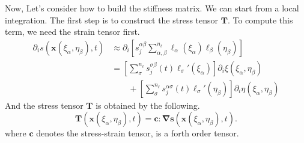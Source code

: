 \documentclass{book}
\begin{document}
Now, Let's consider how to build the stiffness matrix. We can start from a local integration. The first step is to construct the stress tensor $\boldsymbol T$. To compute this term, we need the strain tensor first. 
\begin{equation}
\begin{aligned}
 \partial_i s(\boldsymbol x(\xi_\alpha,\eta_\beta),t) &\approx \partial_i\left[s_j^{\alpha\beta}\sum_{\alpha,\beta}^{n_\ell}\ell_\alpha(\xi_\alpha)\ell_\beta(\eta_\beta)\right]\\
						 &= \left[\sum_\sigma^{n_\ell}s_j^{\sigma\beta}(t)\ell_\sigma'(\xi_\alpha)\right]\partial_i\xi(\xi_\alpha,\eta_\beta)\\
						 &\qquad +\left[\sum_\sigma^{n_\ell}s_j^{\alpha\sigma}(t)\ell_\sigma'(\eta_\beta)\right]\partial_i\eta(\xi_\alpha,\eta_\beta)
\end{aligned}
 \end{equation}
And the stress tensor $\boldsymbol T$ is obtained by the following.
\begin{equation}
 \boldsymbol T(\boldsymbol x(\xi_\alpha,\eta_\beta),t)=\boldsymbol c:\boldsymbol \nabla \boldsymbol s(\boldsymbol x(\xi_\alpha, \eta_\beta),t).
\end{equation}
where $\boldsymbol c$ denotes the stress-strain tensor, is a forth order tensor.












  
\end{document}
